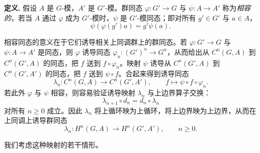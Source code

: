 \noindent\textbf{定义.} 假设 $A$ 是 $G$-模，$A'$ 是 $G'$-模。群同态 $\varphi:G'\to G$ 与 $\psi:A\to A'$ 称为\emph{相容的}，若当 $A$ 通过 $\varphi$ 成为 $G'$-模时，$\psi$ 是 $G'$-模同态；即对所有 $g'\in G'$ 与 $a\in A$，
\[
  \psi(\varphi(g')a)=g'\psi(a).
\]

相容同态的意义在于它们诱导相关上同调群上的群同态。若 $\varphi:G'\to G$ 与 $\psi:A\to A'$ 是同态，则 $\varphi$ 诱导同态 $\varphi_n:(G')^n\to G^n$，从而给出从 $C^n(G,A)$ 到 $C^n(G',A)$ 的同态，把 $f$ 送到 $f\circ\varphi_n$。映射 $\psi$ 诱导从 $C^n(G',A)$ 到 $C^n(G',A')$ 的同态，把 $f$ 送到 $\psi\circ f$。合起来得到诱导同态
\[
  \lambda_n:C^n(G,A)\to C^n(G',A'),
  \qquad f\mapsto \psi\circ f\circ\varphi_n.
\]
若此外 $\varphi$ 与 $\psi$ 相容，则容易验证诱导映射 $\lambda_n$ 与上边界算子交换：
\[
  \lambda_{n+1}\circ d_n=d_n\circ\lambda_n
\]
对所有 $n\geq0$ 成立。因此 $\lambda_n$ 将上循环映为上循环，将上边界映为上边界，从而在上同调上诱导群同态
\[
  \lambda_n:H^n(G,A)\to H^n(G',A'),
  \qquad n\geq0.
\]

我们考虑这种映射的若干情形。

